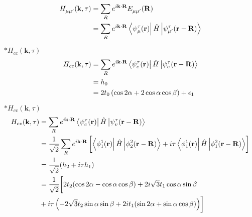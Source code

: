 \documentclass{report}
\newcommand{\f}[2]{\dfrac{#1}{#2}}
\begin{document}
\begin{align*}
	H_{\mu\mu'}^{}(\mathbf{k},\tau)
	 & = \sum_{R} e^{i\mathbf{k\cdot R}} E_{\mu\mu'}^{}(\mathbf{R})                                                                             \\
	 & = \sum_{R} e^{i\mathbf{k\cdot R}}\bra{\psi_{\mu}^{\mathfrak{\tau}}(\mathbf{r})}\hat{H}\ket{\mathcal{\psi}_{\mu'}^{\tau}(\mathbf{r - R})}
\end{align*}

$\ast H_{cc}(\mathbf{k},\tau)$
\begin{align*}
	H_{cc}(\mathbf{k},\tau)
	 & = \sum_{R} e^{i\mathbf{k\cdot R}}\bra{\psi_{c}^{\mathfrak{\tau}}(\mathbf{r})}\hat{H}\ket{\mathcal{\psi}_{c}^{\tau}(\mathbf{r - R})} \\
	 & = h_0                                                                                                                               \\
	 & = 2 t_0 \left(\cos2\alpha + 2\cos\alpha \cos\beta\right) + \epsilon_1
\end{align*}

$\ast H_{cv}(\mathbf{k},\tau)$
\begin{align*}
	H_{cv}(\mathbf{k},\tau)
	 & = \sum_{R} e^{i\mathbf{k\cdot R}}\bra{\psi_{c}^{\mathfrak{\tau}}(\mathbf{r})}\hat{H}\ket{\mathcal{\psi}_{v}^{\tau}(\mathbf{r - R})}                                                                 \\
	 & = \f{1}{\sqrt{2}}\sum_{R} e^{i\mathbf{k\cdot R}}\left[ \bra{\phi^1_1(\mathbf{r})} \hat{H} \ket{\phi^2_2(\mathbf{r-R})} + i\tau\bra{\phi^1_1(\mathbf{r})}\hat{H}\ket{\phi^2_1(\mathbf{r-R})} \right] \\
	 & = \f{1}{\sqrt{2}} (h_2 + i\tau h_1)                                                                                                                                                                 \\
	 & = \frac{1}{\sqrt{2}} \biggl[ 2t_2 (\cos 2\alpha -\cos\alpha\cos\beta ) + 2i\sqrt{3}t_1\cos\alpha\sin\beta                                                                                           \\
	 & + i\tau \left(-2\sqrt{3} t_2 \sin\alpha \sin\beta + 2i t_1(\sin2\alpha + \sin\alpha \cos\beta )\right) \biggr]
\end{align*}
\end{document}
